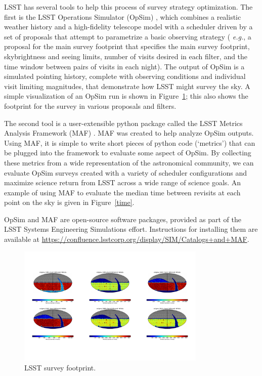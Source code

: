 \documentclass{iau}
\begin{document}
LSST has several tools to help this process of survey strategy
optimization. The first is the LSST Operations Simulator (OpSim)
\cite{opsim}, which combines a realistic weather history and a
high-fidelity telescope model with a scheduler driven by a set of
proposals that attempt to parametrize a basic observing strategy ({\it
e.g.}, a proposal for the main survey footprint that specifies the
main survey footprint, skybrightness and seeing limits, number of
visits desired in each filter, and the time window between pairs of
visits in each night). The output of OpSim is a simulated pointing
history, complete with observing conditions and individual visit
limiting magnitudes, that demonstrate how LSST might survey the sky. A
simple visualization of an OpSim run is shown in
Figure~\ref{footprint}; this also shows the footprint for the
survey in various proposals and filters.

The second tool is a user-extensible python package called the LSST
Metrics Analysis Framework (MAF) \cite{maf}. MAF was created to help
analyze OpSim outputs. Using MAF, it is simple to write short pieces
of python code (`metrics') that can be plugged into the framework to
evaluate some aspect of OpSim. By collecting these metrics from a wide
representation of the astronomical community, we can evaluate OpSim
surveys created with a variety of scheduler configurations and
maximize science return from LSST across a wide range of science
goals. An example of using MAF to evaluate the median time between
revisits at each point on the sky is given in Figure~\ref{time}.

OpSim and MAF are open-source software packages,
provided as part of the LSST Systems Engineering Simulations
effort. Instructions for installing them are available at
\url{https://confluence.lsstcorp.org/display/SIM/Catalogs+and+MAF}. 

\begin{figure}
\centering
\includegraphics[width=0.8\textwidth]{Nvisits}
\caption{LSST survey footprint. 
\label{footprint}}
\end{figure}
\end{document}
